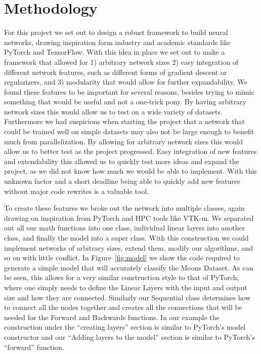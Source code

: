 \section{Methodology}\label{sec:method}

For this project we set out to design a robust framework to build neural
networks, drawing inspiration form industry and academic standards like PyTorch
and TensorFlow. With this idea in place we set out to make a framework that
allowed for 1) arbitrary network sizes 2) easy integration of different network
features, such as different forms of gradient descent or regularizers, and 3)
modularity that would allow for further expandability. We found these features
to be important for several reasons, besides trying to mimic something that
would be useful and not a one-trick pony. By having arbitrary network sizes this
would allow us to test on a wide variety of datasets. Furthermore we had
suspicions when starting the project that a network that could be trained well
on simple datasets may also not be large enough to benefit much from
parallelization. By allowing for arbitrary network sizes this would allow us to
better test as the project progressed. Easy integration of new features and
extendability this allowed us to quickly test more ideas and expand the project,
as we did not know how much we would be able to implement. With this unknown
factor and a short deadline being able to quickly add new features without major
code rewrites is a valuable tool. 

To create these features we broke out the network into multiple classes, again
drawing on inspiration from PyTorch and HPC tools like VTK-m. We separated out
all our math functions into one class, individual linear layers into another
class, and finally the model into a super class. With this construction we could
implement networks of arbitrary sizes, extend them, modify our algorithms, and
so on with little conflict. In Figure~\ref{fig:model} we show the code required
to generate a simple model that will accurately classify the Moons Dataset. As
can be seen, this allows for a very similar construction style to that of
PyTorch, where one simply needs to define the Linear Layers with the input and
output size and how they are connected. Similarly our Sequential class
determines how to connect all the nodes together and creates all the connections
that will be needed for the Forward and Backwards functions. In our example the
construction under the ``creating layers'' section is similar to PyTorch's model
constructor and our ``Adding layers to the model'' section is similar to
PyTorch's ``forward'' function.

